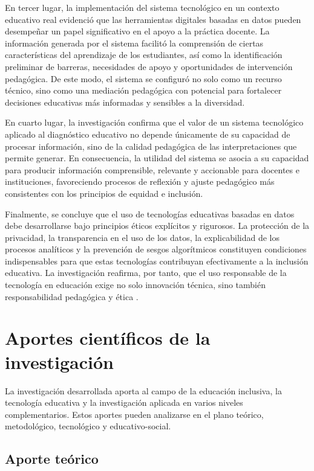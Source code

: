 \begin{refsection}
En tercer lugar, la implementación del sistema tecnológico en un contexto educativo real evidenció que las herramientas digitales basadas en datos pueden desempeñar un papel significativo en el apoyo a la práctica docente. La información generada por el sistema facilitó la comprensión de ciertas características del aprendizaje de los estudiantes, así como la identificación preliminar de barreras, necesidades de apoyo y oportunidades de intervención pedagógica. De este modo, el sistema se configuró no solo como un recurso técnico, sino como una mediación pedagógica con potencial para fortalecer decisiones educativas más informadas y sensibles a la diversidad.

En cuarto lugar, la investigación confirma que el valor de un sistema tecnológico aplicado al diagnóstico educativo no depende únicamente de su capacidad de procesar información, sino de la calidad pedagógica de las interpretaciones que permite generar. En consecuencia, la utilidad del sistema se asocia a su capacidad para producir información comprensible, relevante y accionable para docentes e instituciones, favoreciendo procesos de reflexión y ajuste pedagógico más consistentes con los principios de equidad e inclusión.

Finalmente, se concluye que el uso de tecnologías educativas basadas en datos debe desarrollarse bajo principios éticos explícitos y rigurosos. La protección de la privacidad, la transparencia en el uso de los datos, la explicabilidad de los procesos analíticos y la prevención de sesgos algorítmicos constituyen condiciones indispensables para que estas tecnologías contribuyan efectivamente a la inclusión educativa. La investigación reafirma, por tanto, que el uso responsable de la tecnología en educación exige no solo innovación técnica, sino también responsabilidad pedagógica y ética \parencite{unesco2021}.

\section{Aportes científicos de la investigación}

La investigación desarrollada aporta al campo de la educación inclusiva, la tecnología educativa y la investigación aplicada en varios niveles complementarios. Estos aportes pueden analizarse en el plano teórico, metodológico, tecnológico y educativo-social.

\subsection{Aporte teórico}


\end{refsection}
